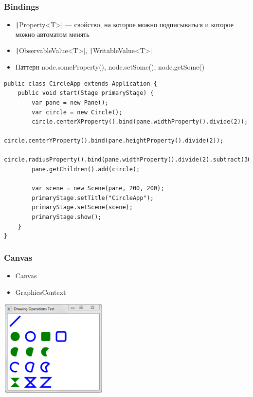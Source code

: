 \documentclass[xetex,mathserif,serif]{beamer}
\begin{document}
	\begin{frame}[fragile]
		\frametitle{Bindings}
		\begin{itemize}
			\item \texttt|Property<T>| --- свойство, на которое можно подписываться и которое можно автоматом менять
			\item \texttt|ObservableValue<T>|, \texttt|WritableValue<T>|
			\item Паттерн node.someProperty(), node.setSome(), node.getSome()
		\end{itemize}
		\begin{scriptsize}
			\begin{verbatim}
public class CircleApp extends Application {
    public void start(Stage primaryStage) {
        var pane = new Pane();
        var circle = new Circle();
        circle.centerXProperty().bind(pane.widthProperty().divide(2));
        circle.centerYProperty().bind(pane.heightProperty().divide(2));
        circle.radiusProperty().bind(pane.widthProperty().divide(2).subtract(30));
        pane.getChildren().add(circle);

        var scene = new Scene(pane, 200, 200);
        primaryStage.setTitle("CircleApp");
        primaryStage.setScene(scene);
        primaryStage.show();
    }
}
			\end{verbatim}
		\end{scriptsize}
	\end{frame}

	\begin{frame}
		\frametitle{Canvas}
		\begin{itemize}
			\item Canvas
			\item GraphicsContext
		\end{itemize}
		\begin{center}
			\includegraphics[width=0.4\textwidth]{canvas.png}
		\end{center}
	\end{frame}
\end{document}
